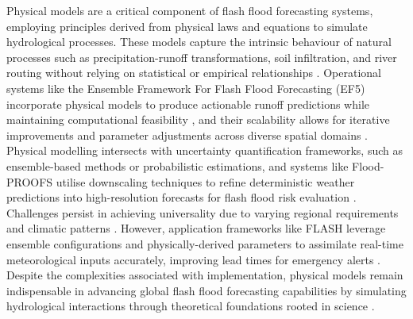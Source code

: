 Physical  models are a critical component of flash flood forecasting systems, employing principles derived from physical laws and equations to simulate hydrological processes. These models capture the intrinsic behaviour of natural processes such as precipitation-runoff transformations, soil infiltration, and river routing without relying on statistical or empirical relationships \citep{Hinge2024}. Operational systems like the Ensemble Framework For Flash Flood Forecasting (EF5) incorporate physical models to produce actionable runoff predictions while maintaining computational feasibility \citep{Flamig2020}, and their scalability allows for iterative improvements and parameter adjustments across diverse spatial domains \citep{Xing2019a}. Physical modelling intersects with uncertainty quantification frameworks, such as ensemble-based methods or probabilistic estimations, and systems like Flood-PROOFS utilise downscaling techniques to refine deterministic weather predictions into high-resolution forecasts for flash flood risk evaluation \citep{Zanchetta2020}. Challenges persist in achieving universality due to varying regional requirements and climatic patterns \citep{Xing2019a, AlRawas2024}. However, application frameworks like FLASH leverage ensemble configurations and physically-derived parameters to assimilate real-time meteorological inputs accurately, improving lead times for emergency alerts \citep{Martinaitis2023}. Despite the complexities associated with implementation, physical models remain indispensable in advancing global flash flood forecasting capabilities by simulating hydrological interactions through theoretical foundations rooted in science \citep{Jubach2016, Zanchetta2020, AlRawas2024, Martinaitis2023}. 

